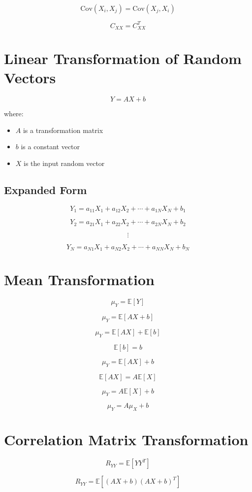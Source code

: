 \documentclass{article}
\begin{document}
\[
\mathrm{Cov}(X_i, X_j) = \mathrm{Cov}(X_j, X_i)
\]

\[
C_{XX} = C_{XX}^T
\]

\section{Linear Transformation of Random Vectors}

\[
Y = A X + b
\]

where:
\begin{itemize}
\item $A$ is a transformation matrix
\item $b$ is a constant vector
\item $X$ is the input random vector
\end{itemize}

\subsection{Expanded Form}

\[
Y_1 = a_{11}X_1 + a_{12}X_2 + \cdots + a_{1N}X_N + b_1
\]

\[
Y_2 = a_{21}X_1 + a_{22}X_2 + \cdots + a_{2N}X_N + b_2
\]

\[
\vdots
\]

\[
Y_N = a_{N1}X_1 + a_{N2}X_2 + \cdots + a_{NN}X_N + b_N
\]

\section{Mean Transformation}

\[
\mu_Y = \mathbb{E}[Y]
\]

\[
\mu_Y = \mathbb{E}[A X + b]
\]

\[
\mu_Y = \mathbb{E}[A X] + \mathbb{E}[b]
\]

\[
\mathbb{E}[b] = b
\]

\[
\mu_Y = \mathbb{E}[A X] + b
\]

\[
\mathbb{E}[A X] = A \mathbb{E}[X]
\]

\[
\mu_Y = A \mathbb{E}[X] + b
\]

\[
\mu_Y = A \mu_X + b
\]

\section{Correlation Matrix Transformation}

\[
R_{YY} = \mathbb{E}[Y Y^T]
\]

\[
R_{YY} = \mathbb{E}[(A X + b)(A X + b)^T]
\]
\end{document}
